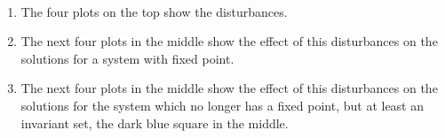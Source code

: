 \begin{multicols}{2}
\\
\begin{enumerate}
	\item
	The four plots on the top show the disturbances.
	\item
	The next four plots in the middle show the effect of this disturbances on the solutions for a system with fixed point. 
	\item
	The next four plots in the middle show the effect of this disturbances on the solutions for the system which no longer has a fixed point, but at least an invariant set, the dark blue square in the middle.
\end{enumerate}
\end{multicols}
